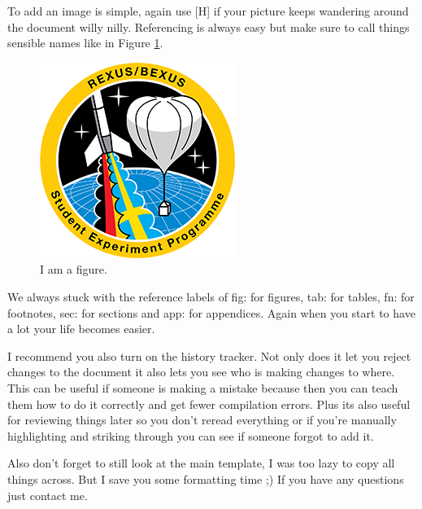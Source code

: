 To add an image is simple, again use [H] if your picture keeps wandering around the document willy nilly. Referencing is always easy but make sure to call things sensible names like in Figure \ref{fig:testing}.
\begin{figure}[H]
    \centering
    \includegraphics{0-cover/img/logo-rexus-bexus.png}
    \caption{I am a figure.}
    \label{fig:testing}
\end{figure}

We always stuck with the reference labels of fig: for figures, tab: for tables, fn: for footnotes, sec: for sections and app: for appendices. Again when you start to have a lot your life becomes easier. 

I recommend you also turn on the history tracker. Not only does it let you reject changes to the document it also lets you see who is making changes to where. This can be useful if someone is making a mistake because then you can teach them how to do it correctly and get fewer compilation errors. Plus its also useful for reviewing things later so you don't reread everything or if you're manually highlighting and striking through you can see if someone forgot to add it.

Also don't forget to still look at the main template, I was too lazy to copy all things across. But I save you some formatting time ;) If you have any questions just contact me. 
